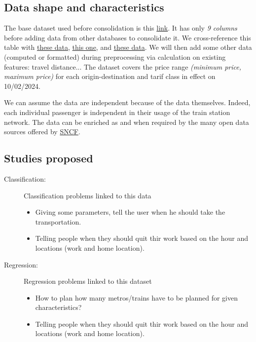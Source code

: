\documentclass[10pt,a4paper,hidelinks]{article}
\begin{document}
\subsection{Data shape and characteristics}
The base dataset used before consolidation is this \href{https://ressources.data.sncf.com/explore/dataset/tarifs-tgv-inoui-ouigo/information/}{link}. It has only \textit{9 columns} before adding data from other databases to consolidate it. We cross-reference this table with \href{https://ressources.data.sncf.com/explore/dataset/gares-pianos/information/}{these data}, \href{https://ressources.data.sncf.com/explore/dataset/gares-equipees-du-wifi/information/}{this one}, and \href{https://ressources.data.sncf.com/explore/dataset/frequentation-gares/information/}{these data}. We will then add some other data (computed or formatted) during preprocessing via calculation on existing features: travel distance... The dataset covers the price range \textit{(minimum price, maximum price)} for each origin-destination and tarif class in effect on 10/02/2024.

We can assume the data are independent because of the data themselves. Indeed, each individual passenger is independent in their usage of the train station network. The data can be enriched as and when required by the many open data sources offered by \href{https://ressources.data.sncf.com/explore/?sort=modified}{SNCF}.

\subsection{Studies proposed}
\begin{description}
    \item[Classification:] Classification problems linked to this data
            \begin{itemize}
                \item Giving some parameters, tell the user when he should take the transportation.
                \item Telling people when they should quit thir work based on the hour and locations (work and home location).
            \end{itemize}
    \item[Regression:] Regression problems linked to this dataset
        \begin{itemize}
            \item How to plan how many metros/trains have to be planned for given characteristics?
            \item Telling people when they should quit thir work based on the hour and locations (work and home location).
        \end{itemize}
\end{description}
\end{document}
